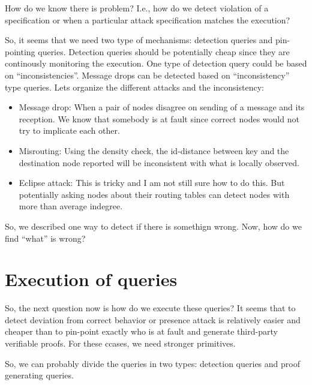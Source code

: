 How do we know there is problem? I.e., how do we detect violation of a 
specification or when a particular attack specification matches the 
execution? 
 
So, it seems that we need two type of mechanisms: detection queries 
and pin-pointing queries. Detection queries should be potentially 
cheap since they are continously monitoring the execution.  
One type of 
detection query could be based on ``inconsistencies''. Message drops 
can be detected based on ``inconsistency'' type queries. Lets organize 
the different attacks and the inconsistency: 
\begin{itemize} 
\item{Message drop:} When a pair of nodes disagree on sending of a 
  message and its reception. We know that somebody is at fault since 
  correct nodes would not try to implicate each other. 
\item{Misrouting:} Using the density check, the id-distance between key 
  and the destination node reported will be inconsistent with what is 
  locally observed. 
\item{Eclipse attack:} This is tricky and I am not still sure how to do 
  this. But potentially asking nodes about their routing tables can 
  detect nodes with more than average indegree. 
\end{itemize} 
 
So, we described one way to detect if there is somethign wrong. Now, 
how do we find ``what'' is wrong? 
 
\fi 
 
 
\section{Execution of queries} 
 
So, the next question now is how do we execute these queries? 
It seems that to detect deviation from correct  
behavior or presence attack is relatively easier and cheaper than to 
pin-point exactly who is at fault and generate third-party verifiable 
proofs. For these ccases, 
we need stronger primitives. 
 
So, we can probably divide the queries in two types: detection queries 
and proof generating queries.  
 
